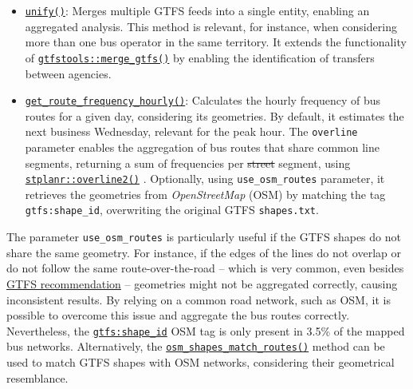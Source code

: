 \documentclass[
]{article}
\providecommand{\DIFadd}[1]{{\protect\color{green}{#1}}} %
\providecommand{\DIFdel}[1]{{\protect\color{red}\sout{#1}}}                      %
\providecommand{\DIFaddbegin}{} %
\providecommand{\DIFaddend}{} %
\providecommand{\DIFdelbegin}{} %
\providecommand{\DIFdelend}{} %
\newcommand{\DIFscaledelfig}{0.5}
\newlength{\DIFdelgraphicswidth} %
\newlength{\DIFdelgraphicsheight} %
\newcommand{\DIFaddincludegraphics}[2][]{{\color{blue}\fbox{\DIFOincludegraphics[#1]{#2}}}} %
\newcommand{\DIFdelincludegraphics}[2][]{%
\sbox{\DIFdelgraphicsbox}{\DIFOincludegraphics[#1]{#2}}%
\settoboxwidth{\DIFdelgraphicswidth}{\DIFdelgraphicsbox} %
\settoboxtotalheight{\DIFdelgraphicsheight}{\DIFdelgraphicsbox} %
\scalebox{\DIFscaledelfig}{%
\parbox[b]{\DIFdelgraphicswidth}{\usebox{\DIFdelgraphicsbox}\\[-\baselineskip] \rule{\DIFdelgraphicswidth}{0em}}\llap{\resizebox{\DIFdelgraphicswidth}{\DIFdelgraphicsheight}{%
\setlength{\unitlength}{\DIFdelgraphicswidth}%
\begin{picture}(1,1)%
\thicklines\linethickness{2pt} %
{\color[rgb]{1,0,0}\put(0,0){\framebox(1,1){}}}%
{\color[rgb]{1,0,0}\put(0,0){\line( 1,1){1}}}%
{\color[rgb]{1,0,0}\put(0,1){\line(1,-1){1}}}%
\end{picture}%
}\hspace*{3pt}}} %
} %
\DeclareRobustCommand{\DIFaddbegin}{\DIFOaddbegin \let\includegraphics\DIFaddincludegraphics} %
\DeclareRobustCommand{\DIFaddend}{\DIFOaddend \let\includegraphics\DIFOincludegraphics} %
\DeclareRobustCommand{\DIFdelbegin}{\DIFOdelbegin \let\includegraphics\DIFdelincludegraphics} %
\DeclareRobustCommand{\DIFdelend}{\DIFOaddend \let\includegraphics\DIFOincludegraphics} %
\begin{document}
\DIFaddend \begin{itemize}
\item
  \href{https://u-shift.github.io/GTFShift/reference/unify.html}{\texttt{unify()}}: Merges multiple GTFS feeds into a single entity, enabling an aggregated analysis.
  This method is relevant, for instance, when considering more than one bus operator in the same territory.
  It extends the functionality of \href{https://ipeagit.github.io/gtfstools/reference/merge_gtfs.html}{\texttt{gtfstools::merge\_gtfs()}} by enabling the identification of transfers between agencies.
\item
  \href{https://u-shift.github.io/GTFShift/reference/get_route_frequency_hourly.html}{\texttt{get\_route\_frequency\_hourly()}}: Calculates the hourly frequency of bus routes for a given day, considering its geometries.
  \DIFaddbegin \DIFadd{It assumes the time of departure at the first stop as a reference for each trip geometry.
  }\DIFaddend By default, it estimates the next business Wednesday, relevant for the peak hour.
  The \texttt{overline} parameter enables the aggregation of bus routes that share common line segments, returning a sum of frequencies per \DIFdelbegin \DIFdel{street }\DIFdelend \DIFaddbegin \DIFadd{road }\DIFaddend segment, using \href{https://docs.ropensci.org/stplanr/reference/overline.html}{\texttt{stplanr::overline2()}} \citep{stplanr}.
  Optionally, using \texttt{use\_osm\_routes} parameter, it retrieves the geometries from \emph{OpenStreetMap} (OSM) by matching the tag \texttt{gtfs:shape\_id}, overwriting the original GTFS \texttt{shapes.txt}.
\end{itemize}

The parameter \texttt{use\_osm\_routes} is particularly useful if the GTFS shapes do not share the same geometry.
For instance, if the edges of the lines do not overlap or do not follow the same route-over-the-road -- which is very common, even besides \href{https://gtfs.org/documentation/schedule/schedule-best-practices/\#shapestxt}{GTFS recommendation} -- geometries might not be aggregated correctly, causing inconsistent results.
By relying on a common road network, such as OSM, it is possible to overcome this issue and aggregate the bus routes correctly.
Nevertheless, the \href{https://wiki.openstreetmap.org/wiki/Key:gtfs:shape_id}{\texttt{gtfs:shape\_id}} OSM tag is only present in 3.5\% of the mapped bus networks.
Alternatively, the \href{https://u-shift.github.io/GTFShift/reference/osm_shapes_match_routes.html}{\texttt{osm\_shapes\_match\_routes()}} method can be used to match GTFS shapes with OSM networks, considering their geometrical resemblance.
\end{document}
